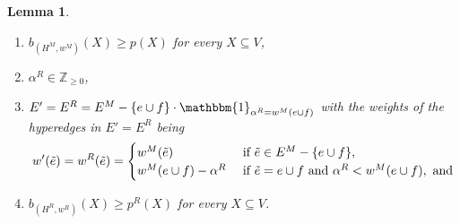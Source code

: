 \documentclass{article}
\newtheorem{lemma}{Lemma}[section]
\newcommand{\indicator}{\ensuremath{\mathbbm{1}}\xspace}
\newcommand{\knote}[1]{{\color{red}[{\tiny Karthik: \bf #1}]\marginpar{\color{red}*}}}
\providecommand{\Z}{\mathbb{Z}}
\begin{document}
\begin{lemma}
\begin{enumerate}[label=(\arabic*)]
        \item $b_{(H^M, w^M)}(X) \geq p(X)$ for every $X \subseteq V$,
        \item $\alpha^R \in \Z_{\geq 0}$, 
        \item 
        $E' = E^R = E^M - \{e\cup f\}\cdot \indicator_{\alpha^R=w^M(e\cup f)}$ with the weights of the hyperedges in $E' = E^R$ being 
        \[
        w'(\Tilde{e}) = w^R(\Tilde{e})=
        \begin{cases}
            w^M(\Tilde{e}) &\text { if } \Tilde{e}\in E^M-\{e\cup f\},\\
            w^M(e\cup f) - \alpha^R &\text { if } \Tilde{e}=e\cup f \text{ and } \alpha^R< w^M(e\cup f), \text{ and}  \\
        \end{cases}
        \]
        \item $b_{(H^R, w^R)}(X) \geq p^R(X)$ for every $X \subseteq V$. 
    \end{enumerate}
\end{lemma}
\end{document}
